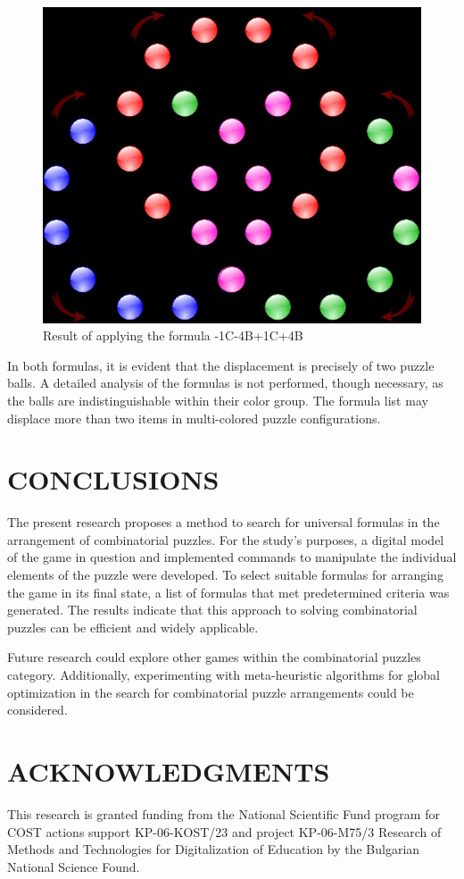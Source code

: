 \documentclass[a4paper,twocolumn,10pt]{article}
\begin{document}
\begin{figure}
	\centering
	\includegraphics[width=1.0\linewidth]{figure03.png}
	\caption{Result of applying the formula -1C-4B+1C+4B}
	\label{figure03}
\end{figure}

In both formulas, it is evident that the displacement is precisely of two puzzle balls. A detailed analysis of the formulas is not performed, though necessary, as the balls are indistinguishable within their color group. The formula list may displace more than two items in multi-colored puzzle configurations.

\section{CONCLUSIONS}

The present research proposes a method to search for universal formulas in the arrangement of combinatorial puzzles. For the study's purposes, a digital model of the game in question and implemented commands to manipulate the individual elements of the puzzle were developed. To select suitable formulas for arranging the game in its final state, a list of formulas that met predetermined criteria was generated. The results indicate that this approach to solving combinatorial puzzles can be efficient and widely applicable.

Future research could explore other games within the combinatorial puzzles category. Additionally, experimenting with meta-heuristic algorithms for global optimization in the search for combinatorial puzzle arrangements could be considered.

\section{ACKNOWLEDGMENTS}

This research is granted funding from the National Scientific Fund program for COST actions support KP-06-KOST/23 and project KP-06-M75/3 Research of Methods and Technologies for Digitalization of Education by the Bulgarian National Science Found.



\end{document}

